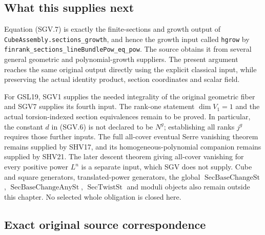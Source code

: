\subsection*{What this supplies next}

Equation (SGV.7) is exactly the finite-sections and growth output of
\nolinkurl{CubeAssembly.sections_growth}, and hence the growth input
called \texttt{hgrow} by
\nolinkurl{finrank_sections_lineBundlePow_eq_pow}.  The source obtains
it from several general geometric and polynomial-growth suppliers.
The present argument reaches the same original output directly using
the explicit classical input, while preserving the actual identity
product, section coordinates and scalar field.

For GSL19, SGV1 supplies the needed integrality of the original
geometric fiber and SGV7 supplies its fourth input.  The rank-one
statement $\dim V_1=1$ and the actual torsion-indexed section
equivalences remain to be proved.  In particular, the constant $d$ in
(SGV.6) is not declared to be $N^g$; establishing all ranks $j^g$
requires those further inputs.  The full all-cover eventual Serre
vanishing theorem remains supplied by SHV17, and its homogeneous-polynomial
companion remains supplied by SHV21.  The later descent theorem giving
all-cover vanishing for every positive power $L^n$ is a separate input,
which SGV does not supply.  Cube and square generators, translated-power
generators, the global $\operatorname{SecBaseChangeSt}$,
$\operatorname{SecBaseChangeAnySt}$, $\operatorname{SecTwistSt}$ and
moduli objects also remain outside this chapter.  No selected whole
obligation is closed here.

\subsection*{Exact original source correspondence}

